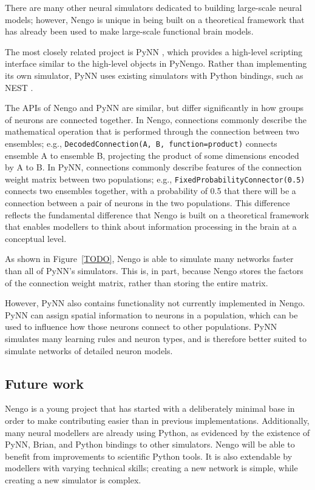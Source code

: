 \documentclass{frontiersSCNS}
\begin{document}
There are many other neural simulators
dedicated to building large-scale neural models;
however, Nengo is unique in being built
on a theoretical framework
that has already been used to make
large-scale functional brain models.

The most closely related project is PyNN
\cite{TODO},
which provides a high-level scripting
interface similar to the
high-level objects in PyNengo.
Rather than implementing its
own simulator, PyNN uses existing
simulators with Python bindings,
such as NEST \cite{TODO}.

The APIs of Nengo and PyNN are similar,
but differ significantly
in how groups of neurons are connected together.
In Nengo, connections commonly describe
the mathematical operation that is performed
through the connection between
two ensembles;
e.g., \texttt{DecodedConnection(A, B,
function=product)} connects ensemble A
to ensemble B, projecting the product of
some dimensions encoded by A to B.
In PyNN, connections commonly describe
features of the connection weight matrix
between two populations;
e.g., \texttt{FixedProbabilityConnector(0.5)}
connects two ensembles together,
with a probability of 0.5
that there will be a connection
between a pair of neurons in the two populations.
This difference reflects the
fundamental difference that Nengo
is built on a theoretical framework
that enables modellers to think
about information processing in the brain
at a conceptual level.

As shown in Figure~\ref{TODO},
Nengo is able to simulate many networks
faster than all of PyNN's simulators.
This is, in part,
because Nengo stores the factors
of the connection weight matrix,
rather than storing the entire matrix.

However, PyNN also contains functionality
not currently implemented in Nengo.
PyNN can assign spatial information
to neurons in a population,
which can be used to influence
how those neurons connect to other populations.
PyNN simulates many learning rules
and neuron types,
and is therefore better suited to
simulate networks of detailed neuron models.

\subsection{Future work}

Nengo is a young project that
has started with a deliberately minimal base
in order to make contributing easier than in
previous implementations.
Additionally, many neural modellers
are already using Python,
as evidenced by the existence of
PyNN, Brian, and Python bindings to other simulators.
Nengo will be able to benefit
from improvements to scientific Python tools.
It is also extendable by modellers with
varying technical skills;
creating a new network is simple,
while creating a new simulator is complex.
\end{document}
